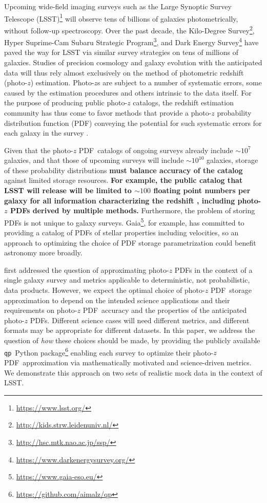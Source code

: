 \documentclass[\docopts]{\docclass}
\newcommand{\qp}{\texttt{qp}}
\newcommand{\pz}{photo-$z$ PDF}
\begin{document}
Upcoming wide-field imaging surveys such as the Large Synoptic Survey Telescope 
(LSST)\footnote{\url{https://www.lsst.org/}}\citep{ivezic_lsst:_2008} will 
observe tens of billions of galaxies photometrically, without follow-up 
spectroscopy.
Over the past decade, the Kilo-Degree 
Survey\footnote{\url{http://kids.strw.leidenuniv.nl/}}, Hyper Suprime-Cam 
Subaru Strategic Program\footnote{\url{http://hsc.mtk.nao.ac.jp/ssp/}}, and 
Dark Energy Survey\footnote{\url{https://www.darkenergysurvey.org/}} have paved 
the way for LSST via similar survey strategies on tens of millions of galaxies.
Studies of precision cosmology and galaxy evolution with the anticipated data 
will thus rely almost exclusively on the method of photometric redshift 
(photo-$z$) estimation.
Photo-$z$s are subject to a number of systematic errors, some caused by the 
estimation procedures and others intrinsic to the data itself.
For the purpose of producing public photo-$z$ catalogs, the redshift estimation 
community has thus come to favor methods that provide a photo-$z$ probability 
distribution function (PDF) conveying the potential for such systematic errors 
for each galaxy in the survey \citep{tanaka_photometric_2017, 
de_jong_third_2017, sheldon_photometric_2012}.

Given that the \pz\ catalogs of ongoing surveys already include $\sim10^{7}$ 
galaxies, and that those of upcoming surveys will include $\sim10^{10}$ 
galaxies, storage of these probability distributions \textbf{must balance 
accuracy of the catalog} against limited storage resources.
\textbf{For example, the public catalog that LSST will release will be limited 
to $\sim100$ floating point numbers per galaxy for all information 
characterizing the redshift \citep[Section 4.2.2]{juric_data_2017}, including 
\pz s derived by multiple methods.}
Furthermore, the problem of storing PDFs is not unique to galaxy surveys.
Gaia\footnote{\url{https://www.gaia-eso.eu/}}, for example, has committed to 
providing a catalog of PDFs of stellar properties including velocities, so an 
approach to optimizing the choice of PDF storage parametrization could benefit 
astronomy more broadly.

\citet{carrasco_kind_sparse_2014} first addressed the question of approximating 
\pz s in the context of a single galaxy survey and metrics applicable to 
deterministic, not probabilistic, data products.
However, we expect the optimal choice of \pz\ storage approximation to depend 
on the intended science applications and their requirements on \pz\ accuracy 
and the properties of the anticipated \pz s.
Different science cases will need different metrics, and different formats may 
be appropriate for different datasets.
In this paper, we address the question of \textit{how} these choices should be 
made, by providing the publicly available \qp\ Python 
package\footnote{\url{https://github.com/aimalz/qp}} enabling each survey to 
optimize their \pz\ approximation via mathematically motivated and 
science-driven metrics.
We demonstrate this approach on two sets of realistic mock data in the context 
of LSST.
\end{document}
